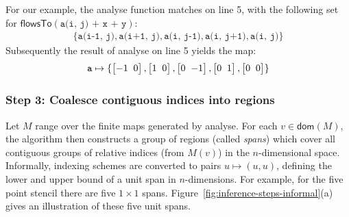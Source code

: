 \documentclass[9pt]{sigplanconf}
\theoremstyle{definition}
\newcommand{\vtwoh}[2]{\setlength{\arraycolsep}{0em}
\left[\begin{array}{cc}#1 \; & \; #2\end{array}\right]}
\begin{document}
For our example, the \textsf{analyse} function matches on
line 5, with the following set for $\textsf{flowsTo}(\texttt{a(i, j) + x +
  y})$:
%
\begin{align*}
\{\texttt{a(i-1, j)}, \texttt{a(i+1, j)}, \texttt{a(i, j-1)},
  \texttt{a(i, j+1)}, \texttt{a(i, j)}\}
\end{align*}
Subsequently the result of \textsf{analyse} on line 5 yields the map:
\begin{align*}
\texttt{a} \mapsto \{\vtwoh{-1}{0}, \vtwoh{1}{0},
          \vtwoh{0}{-1}, \vtwoh{0}{1}, \vtwoh{0}{0}\}
\end{align*}
%

\subsubsection{Step 3: Coalesce contiguous indices into regions}
\label{sec:inf-step3}

Let $M$ range over the finite maps generated by \textsf{analyse}.  For
each $v \in \mathsf{dom}(M)$, the algorithm then constructs a group
of regions (called \emph{spans}) which cover all contiguous groups of relative indices
(from $M(v)$) in the $n$-dimensional space.
Informally, indexing schemes are converted to pairs $u \mapsto (u,
u)$, defining the lower and upper bound of a unit span 
in $n$-dimensions. For
example, for the five point stencil there are five $1 \times 1$ spans.
Figure~\ref{fig:inference-steps-informal}(a) gives an illustration
of these five unit spans.
\end{document}
